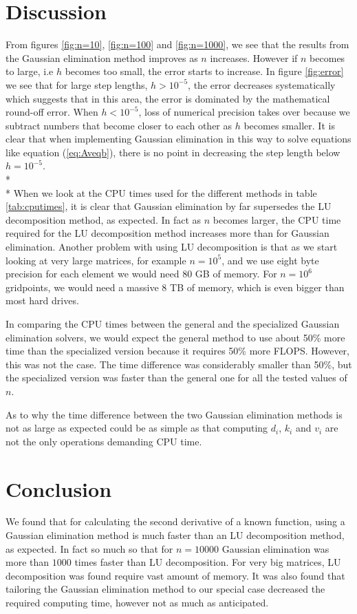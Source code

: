 \documentclass[norsk,a4paper,12pt]{article}
\begin{document}
\section{Discussion}
From figures \ref{fig:n=10}, \ref{fig:n=100} and \ref{fig:n=1000}, we see that the results from the Gaussian elimination method improves as $n$ increases. However if $n$ becomes to large, i.e $h$ becomes too small, the error starts to increase. In figure \ref{fig:error} we see that for large step lengths, $h > 10^{-5}$, the error decreases systematically which suggests that in this area, the error is dominated by the mathematical round-off error. When $h < 10^{-5}$, loss of numerical precision takes over because we subtract numbers that become closer to each other as $h$ becomes smaller. It is clear that when implementing Gaussian elimination in this way to solve equations like equation (\ref{eq:Aveqb}), there is no point in decreasing the step length below $h= 10^{-5}$.
\\* \\* \noindent
When we look at the CPU times used for the different methods in table \ref{tab:cputimes}, it is clear that Gaussian elimination by far supersedes the LU decomposition method, as expected. In fact as $n$ becomes larger, the CPU time required for the LU decomposition method increases more than for Gaussian elimination. Another problem with using LU decomposition is that as we start looking at very large matrices, for example $n=10^5$, and we use eight byte precision for each element we would need $80$ GB of memory. For $n=10^6$ gridpoints, we would need a massive $8$ TB of memory, which is even bigger than most hard drives.  

In comparing the CPU times between the general and the specialized Gaussian elimination solvers, we would expect the general method to use about 50\% more time than the specialized version because it requires 50\% more FLOPS. However, this was not the case. The time difference was considerably smaller than 50\%, but the specialized version was faster than the general one for all the tested values of $n$.

As to why the time difference between the two Gaussian elimination methods is not as large as expected could be as simple as that computing $d_i$, $k_i$ and $v_i$ are not the only operations demanding CPU time.
\section{Conclusion}
We found that for calculating the second derivative of a known function, using a Gaussian elimination method is much faster than an LU decomposition method, as expected. In fact so much so that for $n=10000$ Gaussian elimination was more than $1000$ times faster than LU decomposition. For very big matrices, LU decomposition was found require vast amount of memory. It was also found that tailoring the Gaussian elimination method to our special case decreased the required computing time, however not as much as anticipated. 
\end{document}
